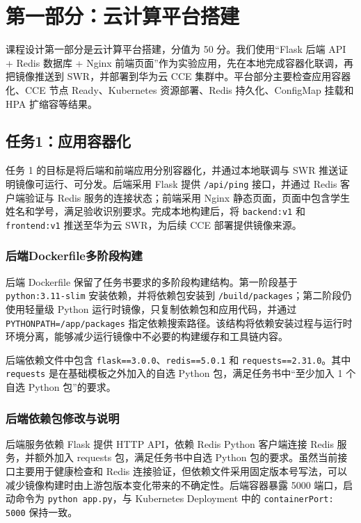 \section{第一部分：云计算平台搭建}

课程设计第一部分是云计算平台搭建，分值为 50 分。我们使用“Flask 后端 API + Redis 数据库 + Nginx 前端页面”作为实验应用，先在本地完成容器化联调，再把镜像推送到 SWR，并部署到华为云 CCE 集群中。平台部分主要检查应用容器化、CCE 节点 Ready、Kubernetes 资源部署、Redis 持久化、ConfigMap 挂载和 HPA 扩缩容等结果。

\subsection{任务1：应用容器化}

任务 1 的目标是将后端和前端应用分别容器化，并通过本地联调与 SWR 推送证明镜像可运行、可分发。后端采用 Flask 提供 \verb|/api/ping| 接口，并通过 Redis 客户端验证与 Redis 服务的连接状态；前端采用 Nginx 静态页面，页面中包含学生姓名和学号，满足验收识别要求。完成本地构建后，将 \verb|backend:v1| 和 \verb|frontend:v1| 推送至华为云 SWR，为后续 CCE 部署提供镜像来源。

\subsubsection{后端Dockerfile多阶段构建}

后端 Dockerfile 保留了任务书要求的多阶段构建结构。第一阶段基于 \verb|python:3.11-slim| 安装依赖，并将依赖包安装到 \verb|/build/packages|；第二阶段仍使用轻量级 Python 运行时镜像，只复制依赖包和应用代码，并通过 \verb|PYTHONPATH=/app/packages| 指定依赖搜索路径。该结构将依赖安装过程与运行时环境分离，能够减少运行镜像中不必要的构建缓存和工具链内容。

后端依赖文件中包含 \verb|flask==3.0.0|、\verb|redis==5.0.1| 和 \verb|requests==2.31.0|。其中 \verb|requests| 是在基础模板之外加入的自选 Python 包，满足任务书中“至少加入 1 个自选 Python 包”的要求。

\subsubsection{后端依赖包修改与说明}

后端服务依赖 Flask 提供 HTTP API，依赖 Redis Python 客户端连接 Redis 服务，并额外加入 requests 包，满足任务书中自选 Python 包的要求。虽然当前接口主要用于健康检查和 Redis 连接验证，但依赖文件采用固定版本号写法，可以减少镜像构建时由上游包版本变化带来的不确定性。后端容器暴露 5000 端口，启动命令为 \verb|python app.py|，与 Kubernetes Deployment 中的 \verb|containerPort: 5000| 保持一致。

